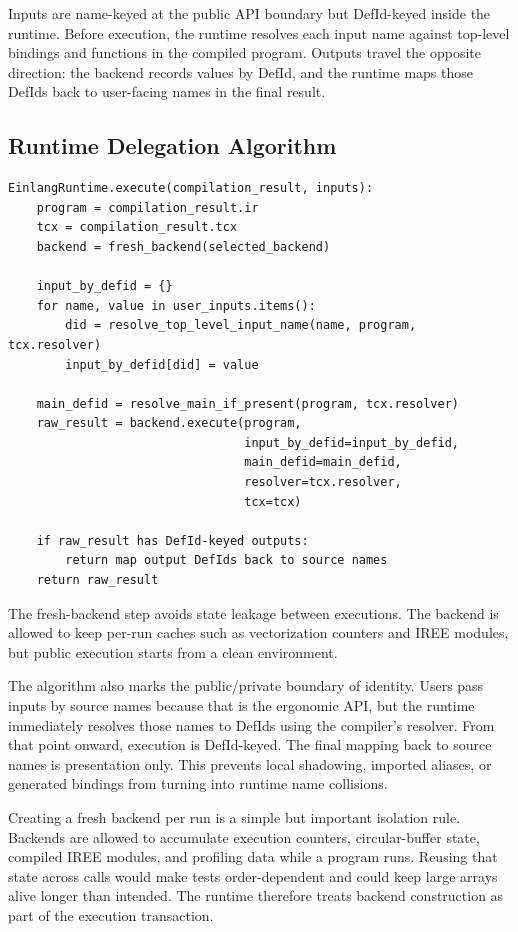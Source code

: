 Inputs are name-keyed at the public API boundary but DefId-keyed inside the
runtime. Before execution, the runtime resolves each input name against
top-level bindings and functions in the compiled program. Outputs travel the
opposite direction: the backend records values by DefId, and the runtime maps
those DefIds back to user-facing names in the final result.

\subsection{Runtime Delegation Algorithm}

\begin{lstlisting}[style=pythoncode,caption={Public execution boundary.}]
EinlangRuntime.execute(compilation_result, inputs):
    program = compilation_result.ir
    tcx = compilation_result.tcx
    backend = fresh_backend(selected_backend)

    input_by_defid = {}
    for name, value in user_inputs.items():
        did = resolve_top_level_input_name(name, program, tcx.resolver)
        input_by_defid[did] = value

    main_defid = resolve_main_if_present(program, tcx.resolver)
    raw_result = backend.execute(program,
                                 input_by_defid=input_by_defid,
                                 main_defid=main_defid,
                                 resolver=tcx.resolver,
                                 tcx=tcx)

    if raw_result has DefId-keyed outputs:
        return map output DefIds back to source names
    return raw_result
\end{lstlisting}

The fresh-backend step avoids state leakage between executions. The backend is
allowed to keep per-run caches such as vectorization counters and IREE modules,
but public execution starts from a clean environment.

The algorithm also marks the public/private boundary of identity. Users pass
inputs by source names because that is the ergonomic API, but the runtime
immediately resolves those names to DefIds using the compiler's resolver. From
that point onward, execution is DefId-keyed. The final mapping back to source
names is presentation only. This prevents local shadowing, imported aliases, or
generated bindings from turning into runtime name collisions.

Creating a fresh backend per run is a simple but important isolation rule.
Backends are allowed to accumulate execution counters, circular-buffer state,
compiled IREE modules, and profiling data while a program runs. Reusing that
state across calls would make tests order-dependent and could keep large arrays
alive longer than intended. The runtime therefore treats backend construction
as part of the execution transaction.

